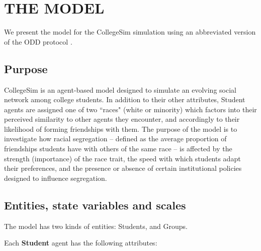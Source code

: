 
\section{THE MODEL}
\label{sec:model}

We present the model for the CollegeSim simulation using an abbreviated
version of the ODD protocol \cite[Grimm \textit{et al.} 2008]{polhill_using_2008}.

\subsection{Purpose}

CollegeSim is an agent-based model designed to simulate an evolving social
network among college students. In addition to their other attributes, Student
agents are assigned one of two ``races" (white or minority) which factors into
their perceived similarity to other agents they encounter, and accordingly to
their likelihood of forming friendships with them. The purpose of the model is
to investigate how racial segregation -- defined as the average proportion of
friendships students have with others of the same race -- is affected by the
strength (importance) of the race trait, the speed with which students adapt
their preferences, and the presence or absence of certain institutional
policies designed to influence segregation.

\subsection{Entities, state variables and scales}

The model has two kinds of entities: Students, and Groups.


\vspace{.1in}
Each \textbf{Student} agent has the following attributes:

